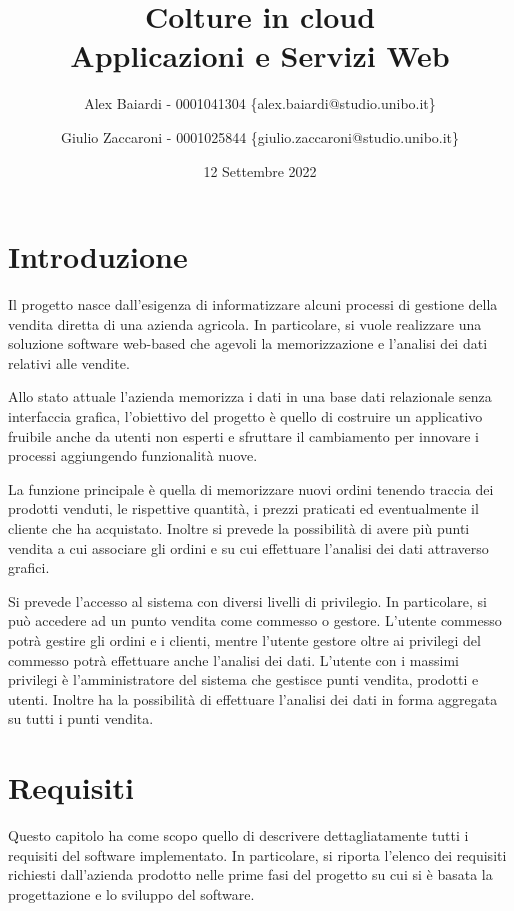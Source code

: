 \documentclass[italian]{report}
\title{
    Colture in cloud \\
    \large Applicazioni e Servizi Web
}
\author{
    Alex Baiardi - 0001041304 \{alex.baiardi@studio.unibo.it\}
    \and
    Giulio Zaccaroni - 0001025844 \{giulio.zaccaroni@studio.unibo.it\}
}
\date{12 Settembre 2022}
\begin{document}
\maketitle
\tableofcontents

\chapter{Introduzione}
Il progetto nasce dall'esigenza di informatizzare alcuni processi di gestione della vendita diretta di una azienda agricola. In particolare, si vuole realizzare una soluzione software web-based che agevoli la memorizzazione e l'analisi dei dati relativi alle vendite.

Allo stato attuale l'azienda memorizza i dati in una base dati relazionale senza interfaccia grafica, l'obiettivo del progetto è quello di costruire un applicativo fruibile anche da utenti non esperti e sfruttare il cambiamento per innovare i processi aggiungendo funzionalità nuove.

La funzione principale è quella di memorizzare nuovi ordini tenendo traccia dei prodotti venduti, le rispettive quantità, i prezzi praticati ed eventualmente il cliente che ha acquistato. Inoltre si prevede la possibilità di avere più punti vendita a cui associare gli ordini e su cui effettuare l'analisi dei dati attraverso grafici.

Si prevede l'accesso al sistema  con diversi livelli di privilegio. In particolare, si può accedere ad un punto vendita come commesso o gestore. L'utente commesso potrà gestire gli ordini e i clienti, mentre l'utente gestore oltre ai privilegi del commesso potrà effettuare anche l'analisi dei dati. L'utente con i massimi privilegi è l'amministratore del sistema che gestisce punti vendita, prodotti e utenti. Inoltre ha la possibilità di effettuare l'analisi dei dati in forma aggregata su tutti i punti vendita.

\chapter{Requisiti}
Questo capitolo ha come scopo quello di descrivere dettagliatamente tutti i requisiti del software implementato. In particolare, si riporta l'elenco dei requisiti richiesti dall'azienda prodotto nelle prime fasi del progetto su cui si è basata la progettazione e lo sviluppo del software.
\end{document}
